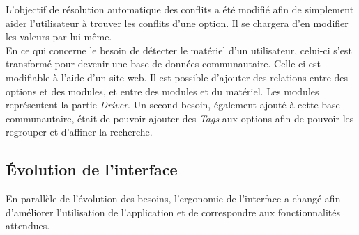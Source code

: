 \documentclass[17pts]{report}
\begin{document}
L'objectif de résolution automatique des conflits a été modifié afin de
simplement aider l'utilisateur à trouver les conflits d'une option. Il se
chargera d'en modifier les valeurs par lui-même.  \\

En ce qui concerne le besoin de détecter le matériel d'un utilisateur, celui-ci
s'est transformé pour devenir une base de données communautaire. Celle-ci est
modifiable à l'aide d'un site web. Il est possible d'ajouter des relations
entre des options et des modules, et entre des modules et du matériel. Les
modules représentent la partie \textit{Driver}. Un second besoin, également
ajouté à cette base communautaire, était de pouvoir ajouter des \textit{Tags}
aux options afin de pouvoir les regrouper et d'affiner la recherche.

\subsection{Évolution de l'interface}
\label{sub:Évolution de l'interface}
En parallèle de l'évolution des besoins, l'ergonomie de l'interface a changé
afin d'améliorer l'utilisation de l'application et de correspondre aux
fonctionnalités attendues.
\end{document}
